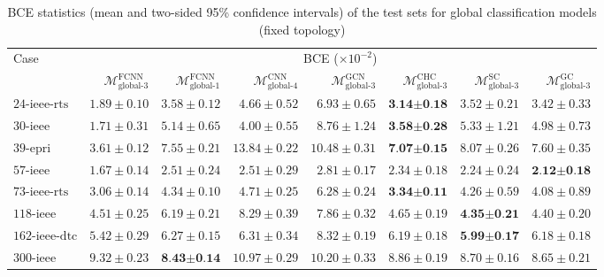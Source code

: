 \documentclass[journal]{IEEEtran}
\begin{document}
\begin{table*}[!ht]
\small
\caption{BCE statistics (mean and two-sided 95\% confidence intervals) of the test sets for global classification models (fixed topology)}
\label{tab:error_clf_global}
\def\na{---}
\centering
    \begin{tabular}{lr|rrrrrr}
    \toprule
    \multirow{2}{*}{Case} & \multicolumn{7}{c}{BCE ($\times 10^{-2}$)} \\
    \cmidrule(r){2-8}
    & $\mathcal{M}^{\textrm{FCNN}}_{\textrm{global-3}}$ & $\mathcal{M}^{\textrm{FCNN}}_{\textrm{global-1}}$ & $\mathcal{M}^{\textrm{CNN}}_{\textrm{global-4}}$ & $\mathcal{M}^{\textrm{GCN}}_{\textrm{global-3}}$ & $\mathcal{M}^{\textrm{CHC}}_{\textrm{global-3}}$ & $\mathcal{M}^{\textrm{SC}}_{\textrm{global-3}}$ & $\mathcal{M}^{\textrm{GC}}_{\textrm{global-3}}$ \\
    \midrule
    $\textrm{24-ieee-rts}$ & $1.89 \pm 0.10$ & $3.58 \pm 0.12$ & $4.66 \pm 0.52$ & $6.93 \pm 0.65$ & $\textbf{3.14} \boldsymbol{\pm} \textbf{0.18}$ & $3.52 \pm 0.21$ & $3.42 \pm 0.33$ \\
    $\textrm{30-ieee}$ & $1.71 \pm 0.31$ & $5.14 \pm 0.65$ & $4.00 \pm 0.55$ & $8.76 \pm 1.24$ & $\textbf{3.58} \boldsymbol{\pm} \textbf{0.28}$ & $5.33 \pm 1.21$ & $4.98 \pm 0.73$ \\
    $\textrm{39-epri}$ & $3.61 \pm 0.12$ & $7.55 \pm 0.21$ & $13.84 \pm 0.22$ & $10.48 \pm 0.31$ & $\textbf{7.07} \boldsymbol{\pm} \textbf{0.15}$ & $8.07 \pm 0.26$ & $7.60 \pm 0.35$ \\
    $\textrm{57-ieee}$ & $1.67 \pm 0.14$ & $2.51 \pm 0.24$ & $2.51 \pm 0.29$ & $2.81 \pm 0.17$ & $2.34 \pm 0.18$ & $2.24 \pm 0.24$ & $\textbf{2.12} \boldsymbol{\pm} \textbf{0.18}$ \\
    $\textrm{73-ieee-rts}$ & $3.06 \pm 0.14$ & $4.34 \pm 0.10$ & $4.71 \pm 0.25$ & $6.28 \pm 0.24$ & $\textbf{3.34} \boldsymbol{\pm} \textbf{0.11}$ & $4.26 \pm 0.59$ & $4.08 \pm 0.89$ \\
    $\textrm{118-ieee}$ & $4.51 \pm 0.25$ & $6.19 \pm 0.21$ & $8.29 \pm 0.39$ & $7.86 \pm 0.32$ & $4.65 \pm 0.19$ & $\textbf{4.35} \boldsymbol{\pm} \textbf{0.21}$ & $4.40 \pm 0.20$ \\
    $\textrm{162-ieee-dtc}$ & $5.42 \pm 0.29$ & $6.27 \pm 0.15$ & $6.31 \pm 0.34$ & $8.32 \pm 0.19$ & $6.19 \pm 0.18$ & $\textbf{5.99} \boldsymbol{\pm} \textbf{0.17}$ & $6.18 \pm 0.18$ \\
    $\textrm{300-ieee}$ & $9.32 \pm 0.23$ & $\textbf{8.43} \boldsymbol{\pm} \textbf{0.14}$ & $10.97 \pm 0.29$ & $10.20 \pm 0.33$ & $8.86 \pm 0.19$ & $8.70 \pm 0.16$ & $8.65 \pm 0.21$ \\

\end{tabular}
\end{table*}
\end{document}
